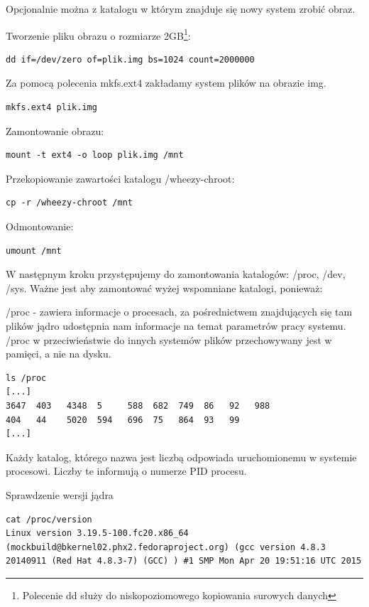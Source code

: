 Opcjonalnie można z katalogu w którym znajduje się nowy system zrobić obraz.

\newline
Tworzenie pliku obrazu o rozmiarze 2GB\footnote{Polecenie dd służy do niskopoziomowego kopiowania surowych danych}:
\begin{lstlisting}
dd if=/dev/zero of=plik.img bs=1024 count=2000000
\end{lstlisting}
\newline

Za pomocą polecenia mkfs.ext4 zakładamy system plików na obrazie img.

\begin{lstlisting}
mkfs.ext4 plik.img
\end{lstlisting}

Zamontowanie obrazu:
\begin{lstlisting}
mount -t ext4 -o loop plik.img /mnt
\end{lstlisting}

Przekopiowanie zawartości katalogu /wheezy-chroot: 
\begin{lstlisting}
cp -r /wheezy-chroot /mnt
\end{lstlisting}

Odmontowanie:
\begin{lstlisting}
umount /mnt
\end{lstlisting}


W następnym kroku przystępujemy do zamontowania katalogów: /proc, /dev, /sys.
Ważne jest aby zamontować wyżej wspomniane katalogi, ponieważ:

/proc - zawiera informacje o procesach, za pośrednictwem znajdujących się tam plików jądro udostępnia nam informacje na temat parametrów pracy systemu.
/proc w przeciwieństwie do innych systemów plików przechowywany jest w pamięci, a nie na dysku. 
\begin{lstlisting}
ls /proc
[...]
3647  403   4348  5     588  682  749  86   92   988               
404   44    5020  594   696  75   864  93   99        
[...]
\end{lstlisting}
Każdy katalog, którego nazwa jest liczbą odpowiada  uruchomionemu w systemie procesowi. Liczby te informują o numerze PID procesu. 	


\newline
Sprawdzenie wersji jądra
\begin{lstlisting}
cat /proc/version
Linux version 3.19.5-100.fc20.x86_64 (mockbuild@bkernel02.phx2.fedoraproject.org) (gcc version 4.8.3 20140911 (Red Hat 4.8.3-7) (GCC) ) #1 SMP Mon Apr 20 19:51:16 UTC 2015
\end{lstlisting} 

